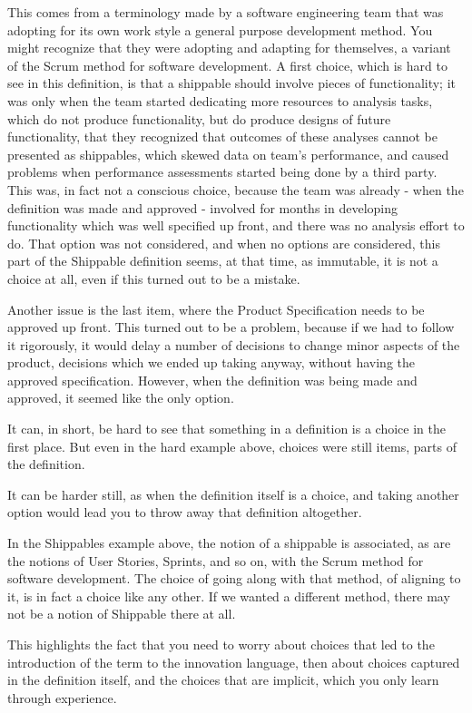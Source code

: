 This comes from a terminology made by a software engineering team that was adopting for its own work style a general purpose development method. You might recognize that they were adopting and adapting for themselves, a variant of the Scrum method for software development. A first choice, which is hard to see in this definition, is that a shippable should involve pieces of functionality; it was only when the team started dedicating more resources to analysis tasks, which do not produce functionality, but do produce designs of future functionality, that they recognized that outcomes of these analyses cannot be presented as shippables, which skewed data on team's performance, and caused problems when performance assessments started being done by a third party. This was, in fact not a conscious choice, because the team was already - when the definition was made and approved - involved for months in developing functionality which was well specified up front, and there was no analysis effort to do. That option was not considered, and when no options are considered, this part of the Shippable definition seems, at that time, as immutable, it is not a choice at all, even if this turned out to be a mistake.

Another issue is the last item, where the Product Specification needs to be approved up front. This turned out to be a problem, because if we had to follow it rigorously, it would delay a number of decisions to change minor aspects of the product, decisions which we ended up taking anyway, without having the approved specification. However, when the definition was being made and approved, it seemed like the only option.

It can, in short, be hard to see that something in a definition is a choice in the first place. But even in the hard example above, choices were still items, parts of the definition.

It can be harder still, as when the definition itself is a choice, and taking another option would lead you to throw away that definition altogether.

In the Shippables example above, the notion of a shippable is associated, as are the notions of User Stories, Sprints, and so on, with the Scrum method for software development. The choice of going along with that method, of aligning to it, is in fact a choice like any other. If we wanted a different method, there may not be a notion of Shippable there at all.

This highlights the fact that you need to worry about choices that led to the introduction of the term to the innovation language, then about choices captured in the definition itself, and the choices that are implicit, which you only learn through experience.

